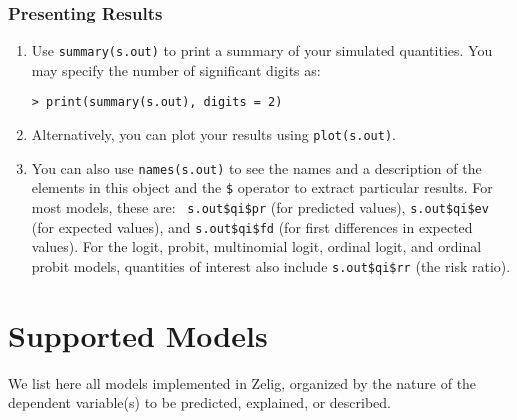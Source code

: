 \subsubsection*{Presenting Results}
\begin{enumerate}
\item Use {\tt summary(s.out)} to print a summary of your simulated
  quantities.  You may specify the number of significant digits as:
\begin{verbatim}
> print(summary(s.out), digits = 2)   
\end{verbatim}
\item Alternatively, you can plot your results using
  \texttt{plot(s.out)}.
\item You can also use \texttt{names(s.out)} to see the names and a
  description of the elements in this object and the {\tt \$} operator
  to extract particular results.  For most models, these are: {\tt
    s.out\$qi\$pr} (for predicted values), {\tt s.out\$qi\$ev} (for
  expected values), and {\tt s.out\$qi\$fd} (for first differences in
  expected values).  For the logit, probit, multinomial logit, ordinal
  logit, and ordinal probit models, quantities of interest also
  include {\tt s.out\$qi\$rr} (the risk ratio).
\end{enumerate} 

\section{Supported Models}\label{s:models}

We list here all models implemented in Zelig, organized by the nature
of the dependent variable(s) to be predicted, explained, or described.

